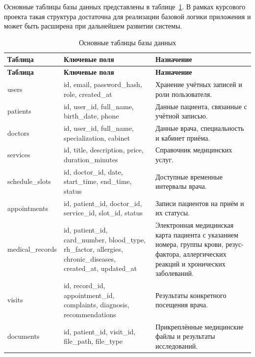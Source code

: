 Основные таблицы базы данных представлены в таблице~\ref{tab:database_tables}. В рамках курсового проекта такая структура достаточна для реализации базовой логики приложения и может быть расширена при дальнейшем развитии системы.

{\small
\setlength{\tabcolsep}{4pt}
\renewcommand{\arraystretch}{1.12}
\begin{longtable}{|>{\raggedright\arraybackslash}p{}|>{\raggedright\arraybackslash}p{}|>{\raggedright\arraybackslash}p{}|}
\caption{Основные таблицы базы данных}\label{tab:database_tables}\\
\hline
\textbf{Таблица} & \textbf{Ключевые поля} & \textbf{Назначение} \\ \hline
\endfirsthead
\tabcont{\ref{tab:database_tables}}
\textbf{Таблица} & \textbf{Ключевые поля} & \textbf{Назначение} \\ \hline
\endhead
users & id, email, password\_hash, role, created\_at & Хранение учётных записей и роли пользователя. \\ \hline
patients & id, user\_id, full\_name, birth\_date, phone & Данные пациента, связанные с учётной записью. \\ \hline
doctors & id, user\_id, full\_name, specialization, cabinet & Данные врача, специальность и кабинет приёма. \\ \hline
services & id, title, description, price, duration\_minutes & Справочник медицинских услуг. \\ \hline
schedule\_slots & id, doctor\_id, date, start\_time, end\_time, status & Доступные временные интервалы врача. \\ \hline
appointments & id, patient\_id, doctor\_id, service\_id, slot\_id, status & Записи пациентов на приём и их статусы. \\ \hline
medical\_records & id, patient\_id, card\_number, blood\_type, rh\_factor, allergies, chronic\_diseases, created\_at, updated\_at & Электронная медицинская карта пациента с указанием номера, группы крови, резус-фактора, аллергических реакций и хронических заболеваний. \\ \hline
visits & id, record\_id, appointment\_id, complaints, diagnosis, recommendations & Результаты конкретного посещения врача. \\ \hline
documents & id, patient\_id, visit\_id, file\_path, file\_type & Прикреплённые медицинские файлы и результаты исследований. \\ \hline
\end{longtable}
}

